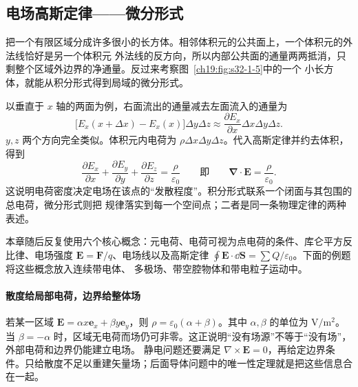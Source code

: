 \subsection{电场高斯定律——微分形式}


把一个有限区域分成许多很小的长方体。相邻体积元的公共面上，一个体积元的外法线恰好是另一个体积元
外法线的反方向，所以内部公共面的通量两两抵消，只剩整个区域外边界的净通量。反过来考察图~\ref{ch19:fig:s32-1-5}中的一个
小长方体，就能从积分形式得到局域的微分形式。

\par\noindent\begin{minipage}{\linewidth}
\differentialCubeFigure
{}\label{ch19:fig:s32-1-5}
\end{minipage}\par\medskip

以垂直于 $x$ 轴的两面为例，右面流出的通量减去左面流入的通量为
\[
  \bigl[E_x(x+\Delta x)-E_x(x)\bigr]\Delta y\Delta z
  \approx\frac{\partial E_x}{\partial x}\Delta x\Delta y\Delta z.
\]
$y,z$ 两个方向完全类似。体积元内电荷为
$\rho\Delta x\Delta y\Delta z$。代入高斯定律并约去体积，得到
\begin{equation}
  \boxed{\frac{\partial E_x}{\partial x}
  +\frac{\partial E_y}{\partial y}
  +\frac{\partial E_z}{\partial z}
  =\frac{\rho}{\varepsilon_0}}
  \qquad\text{即}\qquad
  \boxed{\boldsymbol\nabla\cdot\boldsymbol E=\frac{\rho}{\varepsilon_0}}.
\end{equation}
这说明电荷密度决定电场在该点的“发散程度”。积分形式联系一个闭面与其包围的总电荷，微分形式则把
规律落实到每一个空间点；二者是同一条物理定律的两种表述。

本章随后反复使用六个核心概念：元电荷、电荷可视为点电荷的条件、库仑平方反比律、电场强度
$\boldsymbol E=\boldsymbol F/q$、电场线以及高斯定律
$\oint\boldsymbol E\cdot\dd\boldsymbol S=\sum Q/\varepsilon_0$。下面的例题将这些概念放入连续带电体、
多极场、带空腔物体和带电粒子运动中。

\paragraph{散度给局部电荷，边界给整体场}
若某一区域 $\boldsymbol E=\alpha x\boldsymbol e_x+\beta y\boldsymbol e_y$，则
$\rho=\varepsilon_0(\alpha+\beta)$。其中 $\alpha,\beta$ 的单位为 $\mathrm{V/m^2}$。
当 $\beta=-\alpha$ 时，区域无电荷而场仍可非零。这正说明“没有场源”不等于“没有场”，外部电荷和边界仍能建立电场。
静电问题还要满足 $\nabla\times\boldsymbol E=0$，再给定边界条件。只给散度不足以重建矢量场；后面导体问题中的唯一性定理就是把这些信息合在一起。




